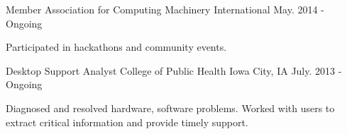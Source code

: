 \begin{cventries}
  \cventry
    {Member}
    {Association for Computing Machinery}
    {International}
    {May. 2014 - Ongoing}
    {
      \begin{cvitems}
        \item {Participated in hackathons and community events.}
      \end{cvitems}
    }
  \cventry
    {Desktop Support Analyst}
    {College of Public Health}
    {Iowa City, IA}
    {July. 2013 - Ongoing}
    {
      \begin{cvitems}
        \item {Diagnosed and resolved hardware, software problems. Worked with users to extract critical information and provide timely support. }
      \end{cvitems}
    }
\end{cventries}
